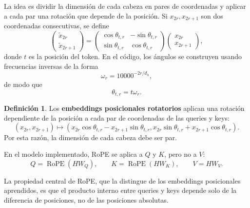 \documentclass[11pt]{report}
\newenvironment{tcolorbox}[1][]{\par\medskip\noindent\ignorespaces}{\par\medskip}
\theoremstyle{definition}
\newtheorem{definicion}{Definición}[section]
\theoremstyle{plain}
\numberwithin{equation}{section}
\begin{document}
La idea es dividir la dimensión de cada cabeza en pares de coordenadas y aplicar a cada par una rotación que depende de la posición. Si \(x_{2r},x_{2r+1}\) son dos coordenadas consecutivas, se define
\begin{equation*}
    \begin{pmatrix}
        \widetilde{x}_{2r}\\
        \widetilde{x}_{2r+1}
    \end{pmatrix}
    =
    \begin{pmatrix}
        \cos\theta_{t,r} & -\sin\theta_{t,r}\\
        \sin\theta_{t,r} & \cos\theta_{t,r}
    \end{pmatrix}
    \begin{pmatrix}
        x_{2r}\\
        x_{2r+1}
    \end{pmatrix},
\end{equation*}
donde \(t\) es la posición del token. En el código, los ángulos se construyen usando frecuencias inversas de la forma
\begin{equation*}
    \omega_r
    =
    10000^{-2r/d_h},
\end{equation*}
de modo que
\begin{equation*}
    \theta_{t,r}
    =
    t\omega_r.
\end{equation*}

\begin{tcolorbox}[colback=blue!8, colframe=blue!8, boxrule=0pt]
\begin{definicion}
Los \textbf{embeddings posicionales rotatorios} aplican una rotación dependiente de la posición a cada par de coordenadas de las queries y keys:
\begin{equation*}
    (x_{2r},x_{2r+1})
    \mapsto
    (x_{2r}\cos\theta_{t,r}-x_{2r+1}\sin\theta_{t,r},
    x_{2r}\sin\theta_{t,r}+x_{2r+1}\cos\theta_{t,r}).
\end{equation*}
Por esta razón, la dimensión de cada cabeza debe ser par.
\end{definicion}
\end{tcolorbox}

En el modelo implementado, RoPE se aplica a \(Q\) y \(K\), pero no a \(V\):
\begin{equation*}
    Q=\operatorname{RoPE}(HW_Q),
    \qquad
    K=\operatorname{RoPE}(HW_K),
    \qquad
    V=HW_V.
\end{equation*}

La propiedad central de RoPE, que la distingue de los embeddings posicionales aprendidos, es que el producto interno entre queries y keys depende solo de la diferencia de posiciones, no de las posiciones absolutas.
\end{document}
